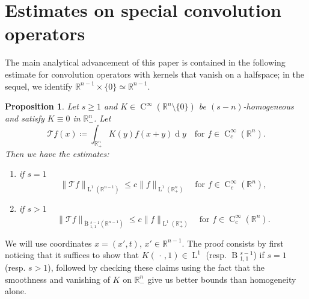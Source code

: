 \documentclass[a4paper,10pt]{amsart}
\newcommand{\R}{\mathbb R}
\renewcommand{\leq}{\leqslant}
\newcommand{\dif}{\mathrm{d}}
\renewcommand{\dif}{\operatorname{d}\!}
\newcommand{\lebe}{\operatorname{L}}
\newcommand{\hold}{\operatorname{C}}
\newcommand{\besov}{\operatorname{B}}
\numberwithin{equation}{section}
\newtheorem{proposition}[theorem]{Proposition}
\theoremstyle{remark}
\numberwithin{equation}{section}
\begin{document}
	\section{Estimates on special convolution operators}\label{sec:convolution}
	The main analytical advancement of this paper is contained in the following estimate for convolution operators with kernels that vanish on a halfspace; in the sequel, we identify $\R^{n-1}\times\{0\}\simeq\R^{n-1}$.
	\begin{proposition}\label{prop:trace}
		Let $s\geq 1$ and $K\in\hold^\infty(\R^n\setminus\{0\})$ be $(s-n)$-homogeneous and satisfy $K\equiv 0$ in $\R^n_-$. Let
		$$
		\mathcal T f(x)\coloneqq \int_{\R^n_+}K(y)f(x+y)\dif y\quad\text{for }f\in\hold^\infty_c(\R^n).
		$$
		Then we have the estimates:
		\begin{enumerate}
			\item\label{itm:s=1} if $s=1$
			$$
			\|\mathcal T f\|_{\lebe^1(\R^{n-1})}\leq c\|f\|_{\lebe^1(\R^n_+)}\quad\text{for }f\in\hold^\infty_c(\R^n),
			$$
			\item\label{itm:s>1} if $s>1$
			$$
			\|\mathcal T f\|_{{\dot{\besov}}{^{s-1}_{1,1}}(\R^{n-1})}\leq c\|f\|_{\lebe^1(\R^n_+)}\quad\text{for }f\in\hold^\infty_c(\R^n).
			$$
		\end{enumerate}
	\end{proposition}
	We will use coordinates $x=(x',t)$, $x'\in\R^{n-1}$. The proof consists by first noticing that it suffices to show that $K(\,\cdot\,,1)\in \lebe^1$ (resp. ${\dot{\besov}}{^{s-1}_{1,1}}$) if $s=1$ (resp. $s>1$), followed by checking these claims using the fact that the smoothness and vanishing of $K$ on $\R^n_-$ give us better bounds than homogeneity alone.
\end{document}
